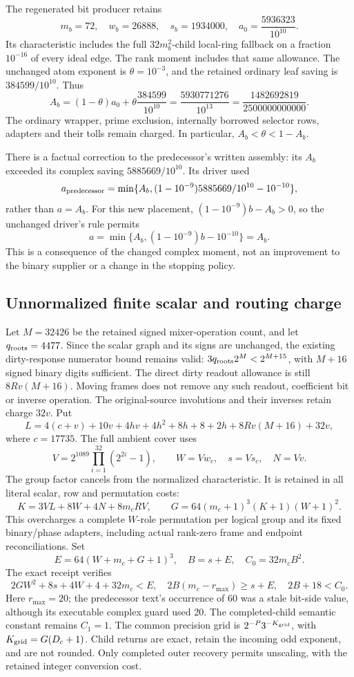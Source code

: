 The regenerated bit producer retains
\[
 m_b=72,\quad w_b=26888,\quad s_b=1934000,\quad
 a_0=\frac{5936323}{10^{10}}.
\]
Its characteristic includes the full $32m_b^2$-child local-ring fallback
on a fraction $10^{-16}$ of every ideal edge. The rank moment includes
that same allowance. The unchanged atom exponent is $\theta=10^{-3}$,
and the retained ordinary leaf saving is $384599/10^{10}$. Thus
\[
 A_b=(1-\theta)a_0+\theta\frac{384599}{10^{10}}
     =\frac{5930771276}{10^{13}}
     =\frac{1482692819}{2500000000000}.
\]
The ordinary wrapper, prime exclusion, internally borrowed selector rows,
adapters and their tolls remain charged. In particular,
$A_b<\theta<1-A_b$.

There is a factual correction to the predecessor's written assembly:
its $A_b$ exceeded its complex saving $5885669/10^{10}$. Its driver used
\[
 a_{\rm predecessor}
 =\min\{A_b,(1-10^{-9})5885669/10^{10}-10^{-10}\},
\]
rather than $a=A_b$. For this new placement,
$(1-10^{-9})b-A_b>0$, so the unchanged driver's rule permits
\[
 a=\min\{A_b,(1-10^{-9})b-10^{-10}\}=A_b.
\]
This is a consequence of the changed complex moment, not an improvement
to the binary supplier or a change in the stopping policy.

\subsection{Unnormalized finite scalar and routing charge}
Let $M=32426$ be the retained signed mixer-operation count, and let
$q_{\rm roots}=4477$. Since the scalar graph and its signs are unchanged,
the existing dirty-response numerator bound remains valid:
$3q_{\rm roots}2^M<2^{M+15}$, with $M+16$ signed binary digits sufficient.
The direct dirty readout allowance is still $8Rv(M+16)$. Moving frames
does not remove any such readout, coefficient bit or inverse operation.
The original-source involutions and their inverses retain charge $32v$.
Put
\[
 L=4(c+v)+10v+4hv+4h^2+8h+8+2h+8Rv(M+16)+32v,
\]
where $c=17735$. The full ambient cover uses
\[
 V=2^{1089}\prod_{i=1}^{32}(2^{2i}-1),\qquad
 W=Vw_c,\quad s=Vs_c,\quad N=Vv.
\]
The group factor cancels from the normalized characteristic. It is
retained in all literal scalar, row and permutation costs:
\[
 K=3VL+8W+4N+8m_cRV,\qquad
 G=64(m_c+1)^3(K+1)(W+1)^2.
\]
This overcharges a complete $W$-role permutation per logical group and
its fixed binary/phase adapters, including actual rank-zero frame and
endpoint reconciliations. Set
\[
 E=64(W+m_c+G+1)^3,\quad B=s+E,\quad C_0=32m_cB^2.
\]
The exact receipt verifies
\[
 2GW^2+8s+4W+4+32m_c<E,\quad
 2B(m_c-r_{\max})\ge s+E,\quad 2B+18<C_0.
\]
Here $r_{\max}=20$; the predecessor text's occurrence of 60 was a stale
bit-side value, although its executable complex guard used 20.
The completed-child semantic constant remains $C_1=1$. The common
precision grid is $2^{-P}3^{-K_{\rm grid}}$, with
$K_{\rm grid}=G(D_c+1)$. Child returns are exact, retain the incoming
odd exponent, and are not rounded. Only completed outer recovery permits
unscaling, with the retained integer conversion cost.

